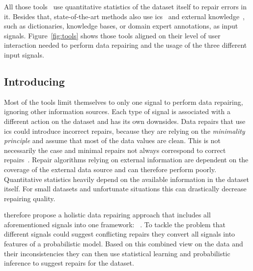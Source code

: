   All those tools~\cite{scare,potters_wheel,data_wrangler,trifacta_wrangler} use quantitative statistics of the dataset itself to repair errors in it.
  Besides that, state-of-the-art methods also use \glspl{ic}~\cite{holistic,ajax,gdr,editing_rules,data_tamer} and external knowledge~\cite{katara}, such as dictionaries, knowledge bases, or domain expert annotations, as input signals.
  Figure~\ref{fig:tools} shows those tools aligned on their level of user interaction needed to perform data repairing and the usage of the three different input signals.

  \begin{figure*}
    \centering
    
    \caption{Data Repairing Tools in Context}
    \label{fig:tools}
  \end{figure*}


  \subsection{Introducing \holoclean{}}
  Most of the tools limit themselves to only one signal to perform data repairing, ignoring other information sources.
  Each type of signal is associated with a different action on the dataset and has its own downsides.
  Data repairs that use \glspl{ic} could introduce incorrect repairs, because they are relying on the \textit{minimality principle} and assume that most of the data values are clean.
  This is not necessarily the case and minimal repairs not always correspond to correct repairs~\cite{holoclean}.
  Repair algorithms relying on external information are dependent on the coverage of the external data source and can therefore perform poorly.
  Quantitative statistics heavily depend on the available information in the dataset itself.
  For small datasets and unfortunate situations this can drastically decrease repairing quality.
  
  \citeauthor{holoclean} therefore propose a holistic data repairing approach that includes all aforementioned signals into one framework: \holoclean{}~\cite{holoclean}.
  To tackle the problem that different signals could suggest conflicting repairs they convert all signals into features of a probabilistic model.
  Based on this combined view on the data and their inconsistencies they can then use statistical learning and probabilistic inference to suggest repairs for the dataset.
  
